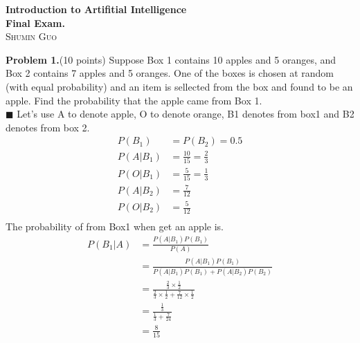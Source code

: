 \documentclass{article}
\newcommand{\solution}[1]{~\\ $\blacksquare$ \sffamily\upshape\selectfont #1
\normalfont ~\\~ }
\begin{document}
\begin{center}
\textbf{\large{
Introduction to Artifitial Intelligence \\
\small{Final Exam.}}} \\
\textsc{\Large{Shumin Guo}}
\end{center}

\textbf{Problem 1.}(10 points) Suppose Box 1 contains 10 apples and 5
oranges, and Box 2 contains 7 apples and 5 oranges. One of the boxes
is chosen at random (with equal probability) and an item is sellected
from the box and found to be an apple. Find the probability that the
apple came from Box 1.
\solution{
  Let's use A to denote apple, O to denote orange, B1 denotes from
  box1 and B2 denotes from box 2. 
  \begin{align*}
    P(B_1) & = P(B_2) = 0.5 \\ 
    P(A|B_1) & = \frac{10}{15} = \frac{2}{3} \\ 
    P(O|B_1) & = \frac{5}{15} = \frac{1}{3} \\ 
    P(A|B_2) & = \frac{7}{12} \\ 
    P(O|B_2) & = \frac{5}{12} \\
  \end{align*}
  The probability of from Box1 when get an apple is.
  \begin{align*}
    P(B_1|A) & = \frac{P(A|B_1)P(B_1)}{P(A)} \\
    & = \frac{P(A|B_1)P(B_1)}{P(A|B_1)P(B_1)+P(A|B_2)P(B_2)} \\
    & = \frac{\frac{2}{3}\times \frac{1}{2}}{\frac{2}{3}\times
      \frac{1}{2}+ \frac{7}{12}\times \frac{1}{2}} \\
    & = \frac{\frac{1}{3}}{\frac{1}{3}+\frac{7}{24}} \\ 
    & = \frac{8}{15} 
  \end{align*}
} 
\end{document}
